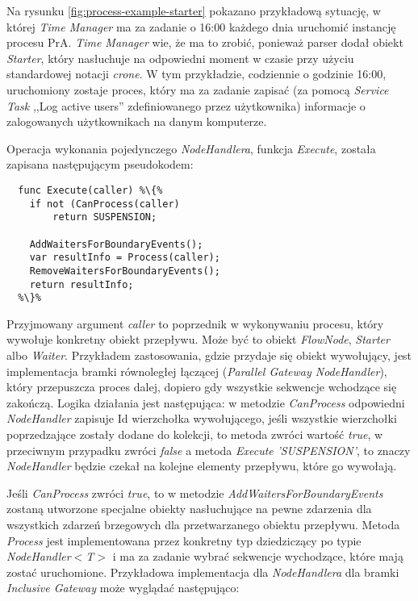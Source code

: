 \documentclass[declaration,shortabstract,mgr]{iithesis}
\begin{document}
Na rysunku \ref{fig:process-example-starter} pokazano przykładową sytuację, w której \textit{Time Manager} ma za zadanie o 16:00 każdego dnia uruchomić instancję procesu PrA. \textit{Time Manager} wie, że ma to zrobić, ponieważ parser dodał obiekt \textit{Starter}, który nasłuchuje na odpowiedni moment w czasie przy użyciu standardowej notacji \textit{crone}. W tym przykładzie, codziennie o godzinie 16:00, uruchomiony zostaje proces, który ma za zadanie zapisać (za pomocą \textit{Service Task} ,,Log active users'' zdefiniowanego przez użytkownika) informacje o zalogowanych użytkownikach na danym komputerze.

Operacja wykonania pojedynczego \textit{NodeHandlera}, funkcja \textit{Execute}, została zapisana następującym pseudokodem:

\begin{minipage}[c]{\textwidth}
\centering
\begin{lstlisting}
  func Execute(caller) %\{%
    if not (CanProcess(caller)
        return SUSPENSION;

    AddWaitersForBoundaryEvents();
    var resultInfo = Process(caller);
    RemoveWaitersForBoundaryEvents();
    return resultInfo;  
  %\}%
\end{lstlisting}
\end{minipage}

Przyjmowany argument \textit{caller} to poprzednik w wykonywaniu procesu, który wywołuje konkretny obiekt przepływu. Może być to obiekt \textit{FlowNode}, \textit{Starter} albo \textit{Waiter}. Przykładem zastosowania, gdzie przydaje się obiekt wywołujący, jest implementacja bramki równoległej łączącej (\textit{Parallel Gateway NodeHandler}), który przepuszcza proces dalej, dopiero gdy wszystkie sekwencje wchodzące się zakończą. Logika działania jest następująca: w metodzie \textit{CanProcess} odpowiedni \textit{NodeHandler} zapisuje Id wierzchołka wywołującego, jeśli wszystkie wierzchołki poprzedzające zostały dodane do kolekcji, to metoda zwróci wartość \textit{true}, w przeciwnym przypadku zwróci \textit{false} a metoda \textit{Execute} \textit{'SUSPENSION'}, to znaczy \textit{NodeHandler} będzie czekał na kolejne elementy przepływu, które go wywołają.

Jeśli \textit{CanProcess} zwróci \textit{true}, to w metodzie \textit{AddWaitersForBoundaryEvents} zostaną utworzone specjalne obiekty nasłuchujące na pewne zdarzenia dla wszystkich zdarzeń brzegowych dla przetwarzanego obiektu przepływu. Metoda \textit{Process} jest implementowana przez konkretny typ dziedziczący po typie \textit{NodeHandler$<$T$>$} i ma za zadanie wybrać sekwencje wychodzące, które mają zostać uruchomione. Przykładowa implementacja dla \textit{NodeHandlera} dla bramki \textit{Inclusive Gateway} może wyglądać następująco:
\end{document}
